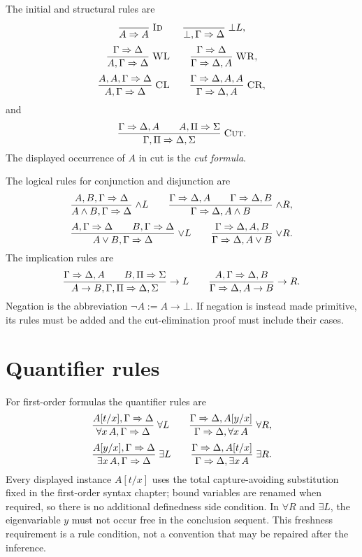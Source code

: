 \documentclass[11pt,oneside,openany]{book}
\theoremstyle{definition}
\theoremstyle{plain}
\theoremstyle{remark}
\newcommand{\bottom}{\bot}
\newcommand{\defeq}{\mathrel{:=}}
\begin{document}
The initial and structural rules are
\[
\frac{}{A\Rightarrow A}\;\textsc{Id}
\qquad
\frac{}{\bottom,\Gamma\Rightarrow\Delta}\;\textsc{\(\bottom L\)},
\]
\[
\frac{\Gamma\Rightarrow\Delta}
     {A,\Gamma\Rightarrow\Delta}\;\textsc{WL}
\qquad
\frac{\Gamma\Rightarrow\Delta}
     {\Gamma\Rightarrow\Delta,A}\;\textsc{WR},
\]
\[
\frac{A,A,\Gamma\Rightarrow\Delta}
     {A,\Gamma\Rightarrow\Delta}\;\textsc{CL}
\qquad
\frac{\Gamma\Rightarrow\Delta,A,A}
     {\Gamma\Rightarrow\Delta,A}\;\textsc{CR},
\]
and
\[
\frac{\Gamma\Rightarrow\Delta,A
      \qquad
      A,\Pi\Rightarrow\Sigma}
     {\Gamma,\Pi\Rightarrow\Delta,\Sigma}\;\textsc{Cut}.
\]
The displayed occurrence of \(A\) in cut is the \emph{cut formula}.

The logical rules for conjunction and disjunction are
\[
\frac{A,B,\Gamma\Rightarrow\Delta}
     {A\land B,\Gamma\Rightarrow\Delta}\;\textsc{\(\land L\)}
\qquad
\frac{\Gamma\Rightarrow\Delta,A
      \qquad
      \Gamma\Rightarrow\Delta,B}
     {\Gamma\Rightarrow\Delta,A\land B}\;\textsc{\(\land R\)},
\]
\[
\frac{A,\Gamma\Rightarrow\Delta
      \qquad
      B,\Gamma\Rightarrow\Delta}
     {A\lor B,\Gamma\Rightarrow\Delta}\;\textsc{\(\lor L\)}
\qquad
\frac{\Gamma\Rightarrow\Delta,A,B}
     {\Gamma\Rightarrow\Delta,A\lor B}\;\textsc{\(\lor R\)}.
\]
The implication rules are
\[
\frac{\Gamma\Rightarrow\Delta,A
      \qquad
      B,\Pi\Rightarrow\Sigma}
     {A\to B,\Gamma,\Pi\Rightarrow\Delta,\Sigma}
     \;\textsc{\(\to L\)}
\qquad
\frac{A,\Gamma\Rightarrow\Delta,B}
     {\Gamma\Rightarrow\Delta,A\to B}
     \;\textsc{\(\to R\)}.
\]
Negation is the abbreviation \(\neg A\defeq A\to\bottom\).  If negation is
instead made primitive, its rules must be added and the cut-elimination proof
must include their cases.

\section{Quantifier rules}
\label{sec:lk-lj-03}

For first-order formulas the quantifier rules are
\[
\frac{A[t/x],\Gamma\Rightarrow\Delta}
     {\forall x\,A,\Gamma\Rightarrow\Delta}\;\textsc{\(\forall L\)}
\qquad
\frac{\Gamma\Rightarrow\Delta,A[y/x]}
     {\Gamma\Rightarrow\Delta,\forall x\,A}\;\textsc{\(\forall R\)},
\]
\[
\frac{A[y/x],\Gamma\Rightarrow\Delta}
     {\exists x\,A,\Gamma\Rightarrow\Delta}\;\textsc{\(\exists L\)}
\qquad
\frac{\Gamma\Rightarrow\Delta,A[t/x]}
     {\Gamma\Rightarrow\Delta,\exists x\,A}\;\textsc{\(\exists R\)}.
\]
Every displayed instance \(A[t/x]\) uses the total capture-avoiding
substitution fixed in the first-order syntax chapter; bound variables are
renamed when required, so there is no additional definedness side condition.
In \(\forall R\) and \(\exists L\), the eigenvariable \(y\) must not occur
free in the conclusion sequent.  This freshness requirement is a rule
condition, not a convention that may be repaired after the inference.
\end{document}
